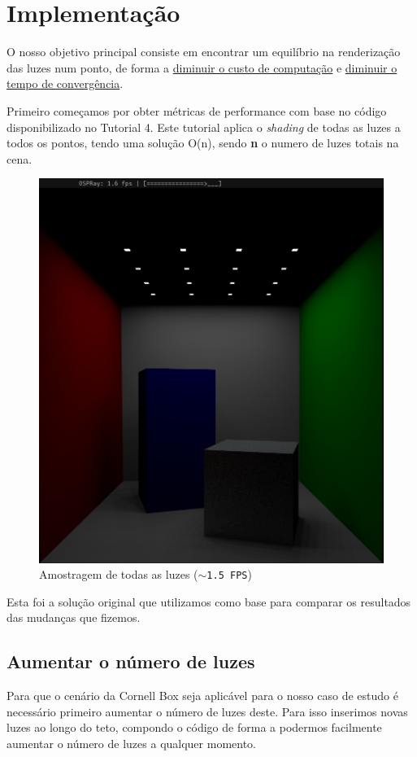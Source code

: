 \documentclass[a4paper]{report}
\begin{document}
\chapter{Implementação}
O nosso objetivo principal consiste em encontrar um equilíbrio na renderização
das luzes num ponto, de forma a \underline{diminuir o custo de computação} e
\underline{diminuir o tempo de convergência}.

Primeiro começamos por obter métricas de performance com base no código
disponibilizado no Tutorial 4. Este tutorial aplica o \textit{shading} de todas
as luzes a todos os pontos, tendo uma solução O(n), sendo \textbf{n} o numero de
luzes totais na cena.

\begin{figure}[H]
    \centering
    \includegraphics[height=8.cm]{images/test_1.png}
    \caption{Amostragem de todas as luzes (\texttt{$\sim$1.5 FPS})}
\end{figure}

Esta foi a solução original que utilizamos como base para
comparar os resultados das mudanças que fizemos.

\pagebreak

\section{Aumentar o número de luzes}

Para que o cenário da Cornell Box seja aplicável para o nosso caso de estudo é
necessário primeiro aumentar o número de luzes deste. Para isso inserimos novas
luzes ao longo do teto, compondo o código de forma a podermos facilmente aumentar
o número de luzes a qualquer momento.
\end{document}
